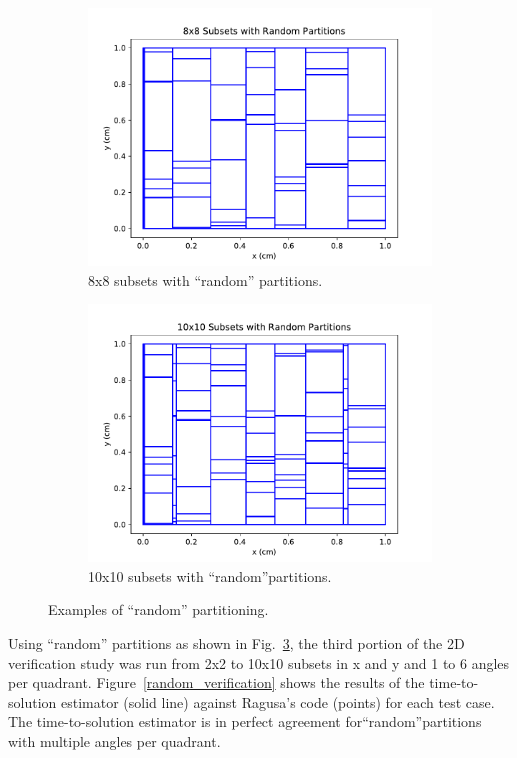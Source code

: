 \begin{figure}[H]
\begin{subfigure}[b]{0.45\textwidth}
  \includegraphics[width=\textwidth]{../cut_line_files/8_random.pdf}
  \caption{8x8 subsets with ``random'' partitions.}
  \label{8random}
\end{subfigure}
\begin{subfigure}[b]{0.45\textwidth}
  \includegraphics[width=\textwidth]{../cut_line_files/10_random.pdf}
  \caption{10x10 subsets with ``random''partitions.}
  \label{10random}
\end{subfigure}
\caption{Examples of ``random'' partitioning.}
\label{random_partitions}
\end{figure}

Using ``random'' partitions as shown in Fig.~\ref{random_partitions}, the third portion of the 2D verification study was run from 2x2 to 10x10 subsets in x and y and 1 to 6 angles per quadrant.  Figure~\ref{random_verification} shows the results of the time-to-solution estimator (solid line) against Ragusa's code (points) for each test case. The time-to-solution estimator is in perfect agreement for``random''partitions with multiple angles per quadrant.

